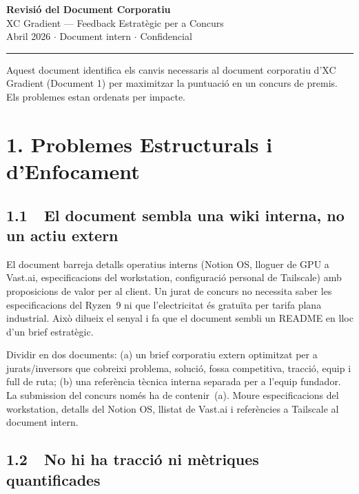 \documentclass[11pt,a4paper]{article}
\begin{document}
\begin{center}
{\Huge\bfseries\color{dark} Revisió del Document Corporatiu}\\[0.4em]
{\Large\color{accent} XC Gradient --- Feedback Estratègic per a Concurs}\\[0.8em]
{\small Abril 2026 $\cdot$ Document intern $\cdot$ Confidencial}
\end{center}

\vspace{0.5em}
\noindent\textcolor{accent}{\rule{\textwidth}{1.5pt}}
\vspace{0.8em}

\noindent Aquest document identifica els canvis necessaris al document corporatiu d'XC Gradient (Document 1) per maximitzar la puntuació en un concurs de premis. Els problemes estan ordenats per impacte.

\section{1. Problemes Estructurals i d'Enfocament}

\subsection{1.1~~El document sembla una wiki interna, no un actiu extern}

\begin{issuebox}
El document barreja detalls operatius interns (Notion OS, lloguer de GPU a Vast.ai, especificacions del workstation, configuració personal de Tailscale) amb proposicions de valor per al client. Un jurat de concurs no necessita saber les especificacions del Ryzen~9 ni que l'electricitat és gratuïta per tarifa plana industrial. Això dilueix el senyal i fa que el document sembli un README en lloc d'un brief estratègic.
\end{issuebox}

\begin{fixbox}
Dividir en dos documents: (a) un brief corporatiu extern optimitzat per a jurats/inversors que cobreixi problema, solució, fossa competitiva, tracció, equip i full de ruta; (b) una referència tècnica interna separada per a l'equip fundador. La submission del concurs només ha de contenir~(a). Moure especificacions del workstation, detalls del Notion OS, llistat de Vast.ai i referències a Tailscale al document intern.
\end{fixbox}

\subsection{1.2~~No hi ha tracció ni mètriques quantificades}
\end{document}
